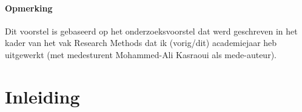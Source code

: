 

\paragraph{Opmerking}
Dit voorstel is gebaseerd op het onderzoeksvoorstel dat werd geschreven in het
kader van het vak Research Methods dat ik (vorig/dit) academiejaar heb
uitgewerkt (met medesturent Mohammed-Ali Kasraoui als mede-auteur).
 

\section{Inleiding}%
\label{sec:inleiding}


%



